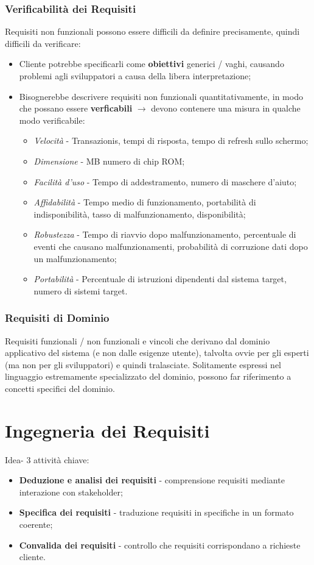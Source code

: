 \documentclass{article}
\begin{document}
      \subsubsection{Verificabilità dei Requisiti}
        Requisiti non funzionali possono essere difficili da definire precisamente, quindi difficili da verificare:
        \begin{itemize}
          \item Cliente potrebbe specificarli come \textbf{obiettivi} generici / vaghi, causando problemi agli sviluppatori a causa della libera interpretazione;
          \item Bisognerebbe descrivere requisiti non funzionali quantitativamente, in modo che possano essere \textbf{verficabili} $\rightarrow$ devono contenere una misura in qualche modo verificabile:
            \begin{itemize}
              \item \textit{Velocità} - Transazioni\/s, tempi di risposta, tempo di refresh sullo schermo;
              \item \textit{Dimensione} - MB \/ numero di chip ROM;
              \item \textit{Facilità d'uso} - Tempo di addestramento, numero di maschere d'aiuto;
              \item \textit{Affidabilità} - Tempo medio di funzionamento, portabilità di indisponibilità, tasso di malfunzionamento, disponibilità;
              \item \textit{Robustezza} - Tempo di riavvio dopo malfunzionamento, percentuale di eventi che causano malfunzionamenti, probabilità di corruzione dati dopo un malfunzionamento;
              \item \textit{Portabilità} - Percentuale di istruzioni dipendenti dal sistema target, numero di sistemi target.
            \end{itemize}
        \end{itemize}
      \subsubsection{Requisiti di Dominio}
        Requisiti funzionali / non funzionali e vincoli che derivano dal dominio applicativo del sistema (e non dalle esigenze utente), talvolta ovvie per gli esperti (ma non per gli sviluppatori) e quindi tralasciate. Solitamente espressi nel linguaggio estremamente specializzato del dominio, possono far riferimento a concetti specifici del dominio.
  \section{Ingegneria dei Requisiti}
    Idea- 3 attività chiave:
    \begin{itemize}
      \item \textbf{Deduzione e analisi dei requisiti} - comprensione requisiti mediante interazione con stakeholder;
      \item \textbf{Specifica dei requisiti} - traduzione requisiti in specifiche in un formato coerente;
      \item \textbf{Convalida dei requisiti} - controllo che requisiti corrispondano a richieste cliente.
    \end{itemize}
\end{document}
